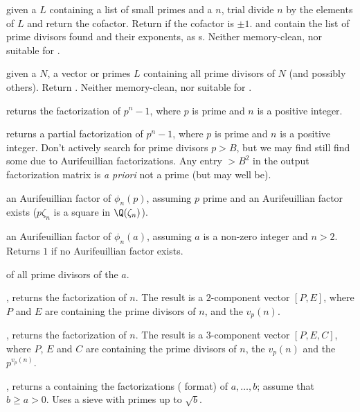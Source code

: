  given a 
$L$ containing a list of small primes and a  $n$, trial divide
$n$ by the elements of $L$ and return the cofactor. Return  if the
cofactor is $\pm 1$.  and  contain the list of prime divisors
found and their exponents, as s. Neither memory-clean, nor
suitable for .

 given a  $N$, a vector or
primes $L$ containing all prime divisors of $N$ (and possibly others). Return
. Neither memory-clean, nor suitable for .

 returns the factorization of $p^n-1$,
where $p$ is prime and $n$ is a positive integer.

 returns a partial
factorization of $p^n-1$, where $p$ is prime and $n$ is a positive integer.
Don't actively search for prime divisors $p > B$, but we may find still find
some due to Aurifeuillian factorizations. Any entry $> B^2$ in the output
factorization matrix is \emph{a priori} not a prime (but may well be).

 an Aurifeuillian factor
of $\phi_n(p)$, assuming $p$ prime and an Aurifeuillian factor exists
($p \zeta_n$ is a square in $\Q(\zeta_n)$).

 an Aurifeuillian factor of
$\phi_n(a)$, assuming $a$ is a non-zero integer and $n > 2$. Returns $1$
if no Aurifeuillian factor exists.

  of all prime divisors of the
 $a$.

, returns the factorization of $n$. The result
is a $2$-component vector $[P,E]$, where $P$ and $E$ are 
containing the prime divisors of $n$, and the $v_p(n)$.

, returns the factorization of $n$. The result
is a $3$-component vector $[P,E,C]$, where $P$, $E$ and $C$ are
 containing the prime divisors of $n$, the $v_p(n)$
and the $p^{v_p(n)}$.

, returns a  containing
the factorizations ( format) of $a,\dots, b$; assume that $b
\geq a > 0$. Uses a sieve with primes up to $\sqrt{b}$.

